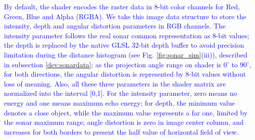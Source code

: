 \documentclass[final,5p,times]{elsarticle}
\begin{document}
\textcolor{blue}{By default, the shader encodes the raster data in 8-bit color channels for Red, Green, Blue and Alpha (RGBA). We take this image data structure to store the intensity, depth and angular distortion parameters in RGB channels. The intensity parameter follows the real sonar common representation as 8-bit values; the depth is replaced by the native GLSL 32-bit depth buffer to avoid precision limitation during the distance histogram (see Fig. \ref{fig:sonar_sim}(iii)), described in subsection \ref{dev:sonardata}; as the projection angle range on shader is $0^{\circ}$ to $90^{\circ}$, for both directions, the angular distortion is represented by 8-bit values without loss of meaning. Also, all these three parameters in the shader matrix are normalized into the interval [0,1]. For the intensity parameter, zero means no energy and one means maximum echo energy; for depth, the minimum value denotes a close object, while the maximum value represents a far one, limited by the sonar maximum range; angle distortion is zero in image center column, and increases for both borders to present the half value of horizontal field of view.}
\end{document}
